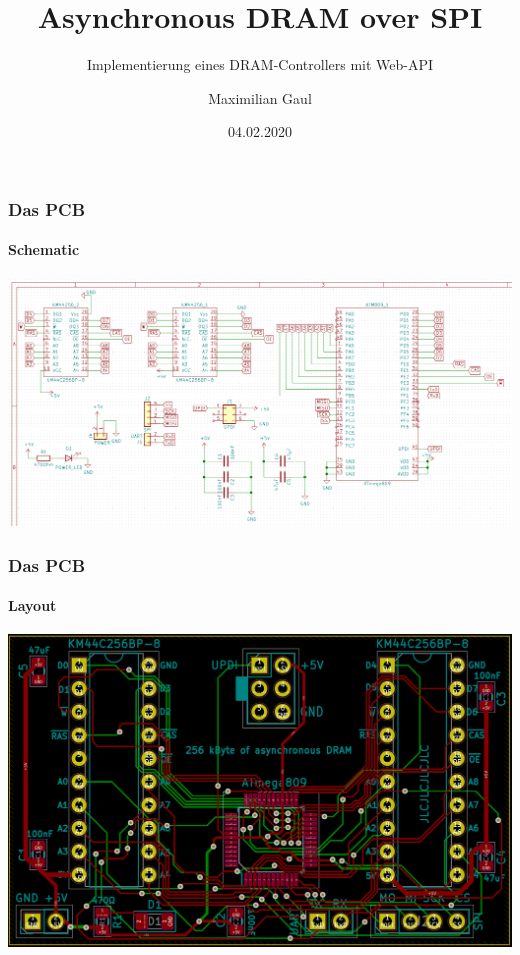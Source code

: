 \documentclass{beamer}
\title{Asynchronous DRAM over SPI}
\subtitle{Implementierung eines DRAM-Controllers mit Web-API}
\author{Maximilian Gaul}
\date{04.02.2020}
\begin{document}
	
\begin{frame}
	\titlepage
\end{frame}

\begin{frame}

	\frametitle{Das PCB}
	\framesubtitle{Schematic}
	\begin{center}
		\includegraphics[scale=0.243]{images/KiCAD_Schematic_View.png}
	\end{center}

\end{frame}

\begin{frame}

	\frametitle{Das PCB}
	\framesubtitle{Layout}
	\begin{center}
		\includegraphics[scale=0.15]{images/KiCAD_2D_PCB_View.png}
	\end{center}
	
\end{frame}
\end{document}
